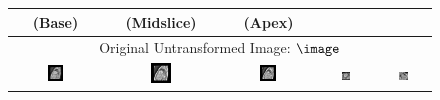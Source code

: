 \renewcommand{\captiontitle}{Representative segmentation results in patients with overt \HCM{}}
\begin{figure}
\begin{center}

\setlength{\tabcolsep}{1pt}

\begin{tabular}{ccccc}

\toprule
\SA{} (Base) & \SA{} (Midslice) & \SA{} (Apex) & \HLA{} & \VLA{} \\
\midrule

\multicolumn{5}{c}{Original Untransformed Image: $\image$} \\

\includegraphics[width=0.19\textwidth]{./data/representative-results/overt/HCMNet_1100083/00_SAX/BASE/0.png} &
\includegraphics[width=0.19\textwidth]{./data/representative-results/overt/HCMNet_1100083/00_SAX/MID/0.png} &
\includegraphics[width=0.19\textwidth]{./data/representative-results/overt/HCMNet_1100083/00_SAX/APEX/0.png} &
\includegraphics[width=0.19\textwidth]{./data/representative-results/overt/HCMNet_1100367/01_HLA/00/0.png} &
\includegraphics[width=0.19\textwidth]{./data/representative-results/overt/HCMNet_1100027/02_VLA/00/0.png} \\


\end{tabular}
\end{center}
\end{figure}
